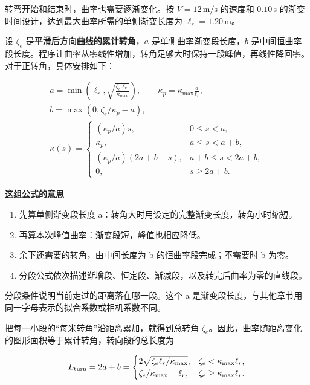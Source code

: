 \documentclass[12pt,a4paper]{article}
\numberwithin{equation}{topic}
\begin{document}
转弯开始和结束时，曲率也需要逐渐变化。按 \(V=12\,\mathrm{m/s}\) 的速度和 \(0.10\,\mathrm s\) 的渐变时间设计，达到最大曲率所需的单侧渐变长度为 \(\ell_r=1.20\,\mathrm m\)。

设 \(\zeta_e\) 是\textbf{平滑后方向曲线的累计转角}，\(a\) 是单侧曲率渐变段长度，\(b\) 是中间恒曲率段长度。程序让曲率从零线性增加，转角足够大时保持一段峰值，再线性降回零。对于正转角，具体安排如下：

\begin{equation}
\label{eq:profile}
\begin{gathered}
a=\min\!\left(\ell_r,\sqrt{\frac{\zeta_e\ell_r}{\kappa_{\max}}}\right),
\qquad
\kappa_p=\kappa_{\max}\frac{a}{\ell_r},
\qquad\\
b=\max(0,\zeta_e/\kappa_p-a),\\[3pt]
\kappa(s)=
\begin{cases}
(\kappa_p/a)s,&0\le s<a,\\
\kappa_p,&a\le s<a+b,\\
(\kappa_p/a)(2a+b-s),&a+b\le s<2a+b,\\
0,&s\ge 2a+b.
\end{cases}
\end{gathered}
\end{equation}

\noindent\textbf{这组公式的意思}\par\nobreak
\begin{enumerate}
\item 先算单侧渐变段长度 a：转角大时用设定的完整渐变长度，转角小时缩短。
\item 再算本次峰值曲率：渐变段短，峰值也相应降低。
\item 余下还需要的转角，由中间长度为 b 的恒曲率段完成；不需要时 b 为零。
\item 分段公式依次描述渐增段、恒定段、渐减段，以及转完后曲率为零的直线段。
\end{enumerate}
分段条件说明当前走过的距离落在哪一段。这个 a 是渐变段长度，与其他章节用同一字母表示的拟合系数或相机系数不同。


把每一小段的“每米转角”沿距离累加，就得到总转角 \(\zeta_e\)。因此，曲率随距离变化的图形面积等于累计转角，转向段的总长度为

\begin{equation}
\label{eq:turn-length}
L_{\rm turn}=2a+b=
\begin{cases}
2\sqrt{\zeta_e\ell_r/\kappa_{\max}},&
\zeta_e<\kappa_{\max}\ell_r,\\
\zeta_e/\kappa_{\max}+\ell_r,&
\zeta_e\ge\kappa_{\max}\ell_r.
\end{cases}
\end{equation}
\end{document}
